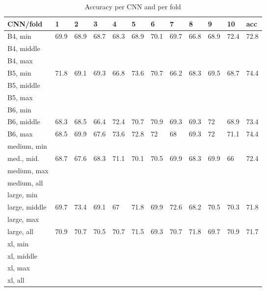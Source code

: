 \documentclass[10pt,letterpaper]{article}
\begin{document}
\begin{table}[!ht]
    \centering
    \caption{Accuracy per CNN and per fold}
    \begin{tabular}{|l|l|l|l|l|l|l|l|l|l|l|l|}
    \hline
        CNN/fold & 1 & 2 & 3 & 4 & 5 & 6 & 7 & 8 & 9 & 10 & acc \\ \hline
        B4, min & 69.9 & 68.9 & 68.7 & 68.3 & 68.9 & 70.1 & 69.7 & 66.8 & 68.9 & 72.4 & 72.8 \\ \hline
        B4, middle & ~ & ~ & ~ & ~ & ~ & ~ & ~ & ~ & ~ & ~ & ~ \\ \hline
        B4, max & ~ & ~ & ~ & ~ & ~ & ~ & ~ & ~ & ~ & ~ & ~ \\ \hline
        B5, min & 71.8 & 69.1 & 69.3 & 66.8 & 73.6 & 70.7 & 66.2 & 68.3 & 69.5 & 68.7 & 74.4 \\ \hline
        B5, middle & ~ & ~ & ~ & ~ & ~ & ~ & ~ & ~ & ~ & ~ & ~ \\ \hline
        B5, max & ~ & ~ & ~ & ~ & ~ & ~ & ~ & ~ & ~ & ~ & ~ \\ \hline
        B6, min & ~ & ~ & ~ & ~ & ~ & ~ & ~ & ~ & ~ & ~ & ~ \\ \hline
        B6, middle & 68.3 & 68.5 & 66.4 & 72.4 & 70.7 & 70.9 & 69.3 & 69.3 & 72 & 68.9 & 73.4 \\ \hline
        B6, max & 68.5 & 69.9 & 67.6 & 73.6 & 72.8 & 72 & 68 & 69.3 & 72 & 71.1 & 74.4 \\ \hline
        medium, min & ~ & ~ & ~ & ~ & ~ & ~ & ~ & ~ & ~ & ~ & ~ \\ \hline
        med., mid. & 68.7 & 67.6 & 68.3 & 71.1 & 70.1 & 70.5 & 69.9 & 68.3 & 69.9 & 66 & 72.4 \\ \hline
        medium, max & ~ & ~ & ~ & ~ & ~ & ~ & ~ & ~ & ~ & ~ & ~ \\ \hline
        medium, all & ~ & ~ & ~ & ~ & ~ & ~ & ~ & ~ & ~ & ~ & ~ \\ \hline
        large, min & ~ & ~ & ~ & ~ & ~ & ~ & ~ & ~ & ~ & ~ & ~ \\ \hline
        large, middle & 69.7 & 73.4 & 69.1 & 67 & 71.8 & 69.9 & 72.6 & 68.2 & 70.5 & 70.3 & 71.8 \\ \hline
        large, max & ~ & ~ & ~ & ~ & ~ & ~ & ~ & ~ & ~ & ~ & ~ \\ \hline
        large, all & 70.9 & 70.7 & 70.5 & 70.7 & 71.5 & 69.3 & 70.7 & 71.8 & 69.7 & 70.9 & 71.7 \\ \hline
        xl, min & ~ & ~ & ~ & ~ & ~ & ~ & ~ & ~ & ~ & ~ & ~ \\ \hline
        xl, middle & ~ & ~ & ~ & ~ & ~ & ~ & ~ & ~ & ~ & ~ & ~ \\ \hline
        xl, max & ~ & ~ & ~ & ~ & ~ & ~ & ~ & ~ & ~ & ~ & ~ \\ \hline
        xl, all & ~ & ~ & ~ & ~ & ~ & ~ & ~ & ~ & ~ & ~ & ~ \\ \hline
    \end{tabular}
\end{table}
\end{document}
